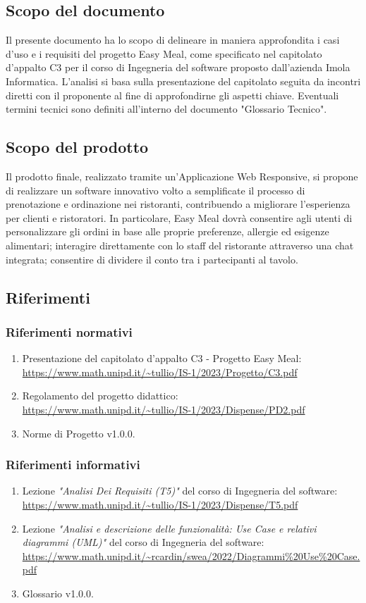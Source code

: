 \documentclass[12pt, oneside]{article}
\begin{document}
\subsection{Scopo del documento}
Il presente documento ha lo scopo di delineare in maniera approfondita i casi d'uso e i requisiti del progetto Easy Meal, come specificato nel capitolato d'appalto C3 per il corso di Ingegneria del software proposto dall'azienda Imola Informatica.
L'analisi si basa sulla presentazione del capitolato seguita da incontri diretti con il proponente al fine di approfondirne gli aspetti chiave. Eventuali termini tecnici sono definiti all'interno del documento "Glossario Tecnico".
\subsection{Scopo del prodotto}
Il prodotto finale, realizzato tramite un'Applicazione Web Responsive, si propone di realizzare un software innovativo volto a semplificate il processo di prenotazione e ordinazione nei ristoranti, contribuendo a migliorare l'esperienza per clienti e ristoratori. In particolare, Easy Meal dovrà consentire agli utenti di personalizzare gli ordini in base alle proprie preferenze, allergie ed esigenze alimentari; interagire direttamente con lo staff del ristorante attraverso una chat integrata; consentire di dividere il conto tra i partecipanti al tavolo.
\subsection{Riferimenti}
\subsubsection{Riferimenti normativi}
\begin{enumerate}
    \item Presentazione del capitolato d'appalto C3 - Progetto Easy Meal: \\ \url{https://www.math.unipd.it/~tullio/IS-1/2023/Progetto/C3.pdf}
    \item Regolamento del progetto didattico: \\ \url{https://www.math.unipd.it/~tullio/IS-1/2023/Dispense/PD2.pdf}
    \item Norme di Progetto v1.0.0.
\end{enumerate}
\subsubsection{Riferimenti informativi}
\begin{enumerate}
    \item Lezione \emph{"Analisi Dei Requisiti (T5)"} del corso di Ingegneria del software: \\ \url{https://www.math.unipd.it/~tullio/IS-1/2023/Dispense/T5.pdf}
    \item Lezione \emph{"Analisi e descrizione delle funzionalità: Use Case e relativi diagrammi (UML)"} del corso di Ingegneria del software: \\ \url{https://www.math.unipd.it/~rcardin/swea/2022/Diagrammi%20Use%20Case.pdf}
    \item Glossario v1.0.0.
\end{enumerate}
\newpage
\end{document}
